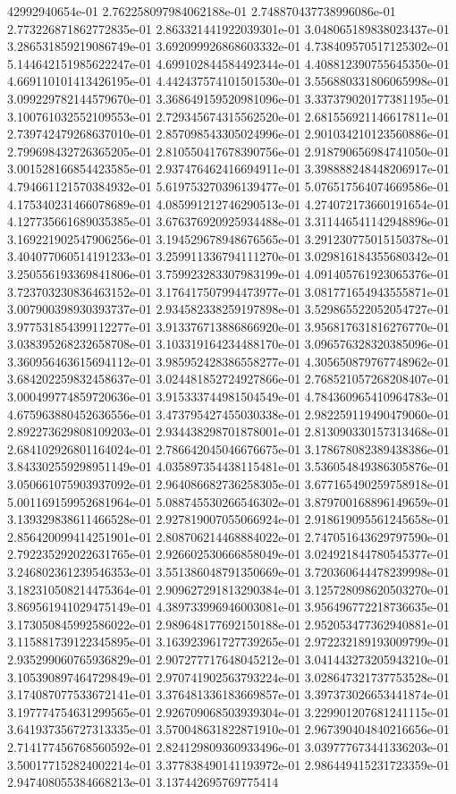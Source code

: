 42992940654e-01	2.762258097984062188e-01	2.748870437738996086e-01	2.773226871862772835e-01	2.863321441922039301e-01	3.048065189838023437e-01	3.286531859219086749e-01	3.692099926868603332e-01	4.738409570517125302e-01	5.144642151985622247e-01	4.699102844584492344e-01	4.408812390755645350e-01	4.669110101413426195e-01	4.442437574101501530e-01	3.556880331806065998e-01	3.099229782144579670e-01	3.368649159520981096e-01	3.337379020177381195e-01	3.100761032552109553e-01	2.729345674315562520e-01	2.681556921146617811e-01	2.739742479268637010e-01	2.857098543305024996e-01	2.901034210123560886e-01	2.799698432726365205e-01	2.810550417678390756e-01	2.918790656984741050e-01	3.001528166854423585e-01	2.937476462416694911e-01	3.398888248448206917e-01	4.794661121570384932e-01	5.619753270396139477e-01	5.076517564074669586e-01	4.175340231466078689e-01	4.085991212746290513e-01	4.274072173660191654e-01	4.127735661689035385e-01	3.676376920925934488e-01	3.311446541142948896e-01	3.169221902547906256e-01	3.194529678948676565e-01	3.291230775015150378e-01	3.404077060514191233e-01	3.259911336794111270e-01	3.029816184355680342e-01	3.250556193369841806e-01	3.759923283307983199e-01	4.091405761923065376e-01	3.723703230836463152e-01	3.176417507994473977e-01	3.081771654943555871e-01	3.007900398930393737e-01	2.934582338259197898e-01	3.529865522052054727e-01	3.977531854399112277e-01	3.913376713886866920e-01	3.956817631816276770e-01	3.038395268232658708e-01	3.103319164234488170e-01	3.096576328320385096e-01	3.360956463615694112e-01	3.985952428386558277e-01	4.305650879767748962e-01	3.684202259832458637e-01	3.024481852724927866e-01	2.768521057268208407e-01	3.000499774859720636e-01	3.915333744981504549e-01	4.784360965410964783e-01	4.675963880452636556e-01	3.473795427455030338e-01	2.982259119490479060e-01	2.892273629808109203e-01	2.934438298701878001e-01	2.813090330157313468e-01	2.684102926801164024e-01	2.786642045046676675e-01	3.178678082389438386e-01	3.843302559298951149e-01	4.035897354438115481e-01	3.536054849386305876e-01	3.050661075903937092e-01	2.964086682736258305e-01	3.677165490259758918e-01	5.001169159952681964e-01	5.088745530266546302e-01	3.879700168896149659e-01	3.139329838611466528e-01	2.927819007055066924e-01	2.918619095561245658e-01	2.856420099414251901e-01	2.808706214468884022e-01	2.747051643629797590e-01	2.792235292022631765e-01	2.926602530666858049e-01	3.024921844780545377e-01	3.246802361239546353e-01	3.551386048791350669e-01	3.720360644478239998e-01	3.182310508214475364e-01	2.909627291813290384e-01	3.125728098620503270e-01	3.869561941029475149e-01	4.389733996946003081e-01	3.956496772218736635e-01	3.173050845992586022e-01	2.989648177692150188e-01	2.952053477362940881e-01	3.115881739122345895e-01	3.163923961727739265e-01	2.972232189193009799e-01	2.935299060765936829e-01	2.907277717648045212e-01	3.041443273205943210e-01	3.105390897464729849e-01	2.970741902563793224e-01	3.028647321737753528e-01	3.174087077533672141e-01	3.376481336183669857e-01	3.397373026653441874e-01	3.197774754631299565e-01	2.926709068503939304e-01	3.229901207681241115e-01	3.641937356727313335e-01	3.570048631822871910e-01	2.967390404840216656e-01	2.714177456768560592e-01	2.824129809360933496e-01	3.039777673441336203e-01	3.500177152824002214e-01	3.377838490141193972e-01	2.986449415231723359e-01	2.947408055384668213e-01	3.137442695769775414